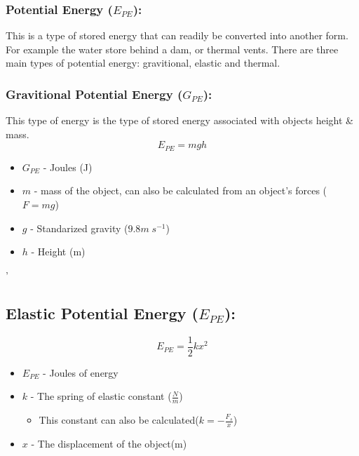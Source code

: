 \documentclass[a5paper]{report}
\begin{document}
	\subsubsection*{Potential Energy ($E_{PE}$):}
	This is a type of stored energy that can readily be converted into another form. For example the water store behind a dam, or thermal vents. There are three main types of potential energy: gravitional, elastic and thermal.
	\subsubsection*{Gravitional Potential Energy ($G_{PE}$):}
	This type of energy is the type of stored energy associated with objects height \& mass.
	$$E_{PE}=mgh$$
	\begin{itemize}
		\item $G_{PE}$ - Joules (J)
		\item $m$ - mass of the object, can also be calculated from an object's forces ($F=mg$)
		\item $g$ - Standarized gravity ($9.8m\;s^{-1}$)
		\item $h$ - Height (m)
	\end{itemize}'
	\subsection*{Elastic Potential Energy ($E_{PE}$):}
	$$E_{PE}=\frac{1}{2}kx^{2}$$
	\begin{itemize}
		\item $E_{PE}$ - Joules of energy
		\item $k$ - The spring of elastic constant ($\frac{N}{m}$)
		\begin{itemize}
			\item This constant can also be calculated($k=-\frac{F_{s}}{x}$)
		\end{itemize}
		\item $x$ - The displacement of the object(m)
	\end{itemize}
\end{document}
